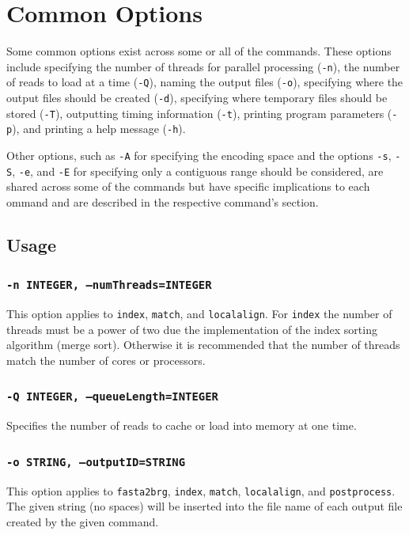 \documentclass[a4paper,12pt]{book}
\newcommand{\TT}[1]{{\tt #1}} %
\begin{document}
\section{Common Options}
\label{sec:commonoptions}
Some common options exist across some or all of the commands. 
These options include specifying the number of threads for parallel processing (\TT{-n}), the number of reads to load at a time (\TT{-Q}), naming the output files (\TT{-o}), specifying where the output files should be created (\TT{-d}), specifying where temporary files should be stored (\TT{-T}), outputting timing information (\TT{-t}), printing program parameters (\TT{-p}), and printing a help message (\TT{-h}).

Other options, such as \TT{-A} for specifying the encoding space and the options \TT{-s}, \TT{-S}, \TT{-e}, and \TT{-E} for specifying only a contiguous range should be considered, are shared across some of the commands but have specific implications to each ommand and are described in the respective command's section.

\subsection{Usage}
\subsubsection{\TT{-n INTEGER, --numThreads=INTEGER}}
This option applies to \TT{index}, \TT{match}, and \TT{localalign}. 
For \TT{index} the number of threads must be a power of two due the implementation of the index sorting algorithm (merge sort).
Otherwise it is recommended that the number of threads match the number of cores or processors.

\subsubsection{\TT{-Q INTEGER, --queueLength=INTEGER}}
Specifies the number of reads to cache or load into memory at one time.

\subsubsection{\TT{-o STRING, --outputID=STRING}}
This option applies to \TT{fasta2brg}, \TT{index}, \TT{match}, \TT{localalign}, and \TT{postprocess}.
The given string (no spaces) will be inserted into the file name of each output file created by the given command.
\end{document}
